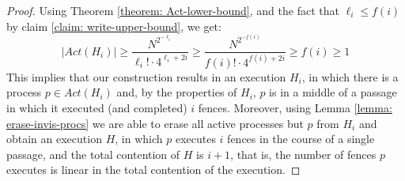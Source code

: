 \begin{proof}
Using Theorem \ref{theorem: Act-lower-bound}, and the fact that $\ell_i \leq f(i)$ by claim \ref{claim: write-upper-bound}, we get:
$$|Act(H_i)| \geq \frac{N^{2^{-\ell_i}}}{\ell_i! \cdot 4^{\ell_i+2i}} \geq
\frac{N^{2^{-f(i)}}}{f(i)! \cdot 4^{f(i)+2i}} \geq f(i) \geq 1
$$
This implies that our construction results in an execution $H_i$, in which there is a process $p \in Act(H_i)$ and, by the properties of $H_i$, $p$ is in a middle of a passage in which it executed (and completed) $i$ fences.
Moreover, using Lemma \ref{lemma: erase-invis-procs} we are able to erase all active processes but $p$ from $H_i$ and obtain an execution $H$, in which $p$ executes $i$ fences in the course of a single passage, and the total contention of $H$ is $i+1$, that is, the number of fences $p$ executes is linear in the total contention of the execution.
\end{proof}



